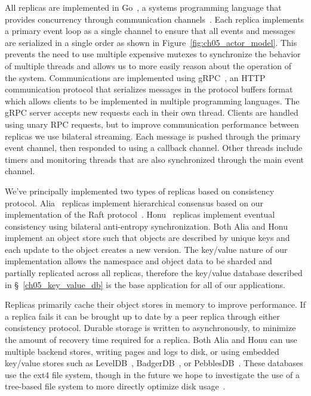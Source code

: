All replicas are implemented in Go~\cite{golang}, a systems programming language that provides concurrency through communication channels~\cite{csp}.
Each replica implements a primary event loop as a single channel to ensure that all events and messages are serialized in a single order as shown in Figure~\ref{fig:ch05_actor_model}.
This prevents the need to use multiple expensive mutexes to synchronize the behavior of multiple threads and allows us to more easily reason about the operation of the system.
Communications are implemented using gRPC~\cite{grpc}, an HTTP communication protocol that serializes messages in the protocol buffers format~\cite{protocol_buffers} which allows clients to be implemented in multiple programming languages.
The gRPC server accepts new requests each in their own thread.
Clients are handled using unary RPC requests, but to improve communication performance between replicas we use bilateral streaming.
Each message is pushed through the primary event channel, then responded to using a callback channel.
Other threads include timers and monitoring threads that are also synchronized through the main event channel.

We've principally implemented two types of replicas based on consistency protocol.
Alia~\cite{alia} replicas implement hierarchical consensus based on our implementation of the Raft protocol~\cite{alia_raft}.
Honu~\cite{honu} replicas implement eventual consistency using bilateral anti-entropy synchronization.
Both Alia and Honu implement an object store such that objects are described by unique keys and each update to the object creates a new version.
The key/value nature of our implementation allows the namespace and object data to be sharded and partially replicated across all replicas, therefore the key/value database described in \S~\ref{ch05_key_value_db} is the base application for all of our applications.

Replicas primarily cache their object stores in memory to improve performance.
If a replica fails it can be brought up to date by a peer replica through either consistency protocol.
Durable storage is written to asynchronously, to minimize the amount of recovery time required for a replica.
Both Alia and Honu can use multiple backend stores, writing pages and logs to disk, or using embedded key/value stores such as LevelDB~\cite{leveldb}, BadgerDB~\cite{badgerdb}, or PebblesDB~\cite{pebblesdb}.
These databases use the ext4 file system, though in the future we hope to investigate the use of a tree-based file system to more directly optimize disk usage~\cite{btrfs}.

